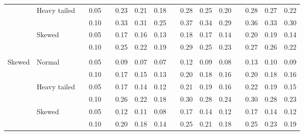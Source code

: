 \documentclass{article} %
\begin{document}
\begin{table}[ht]
\begin{scriptsize}
\begin{center}
\begin{tabular}{ll p{.1cm} c p{.1cm} rrr p{.1cm} rrr p{.1cm} rrr}
             & Heavy tailed && 0.05 &&   0.23 & 0.21 & 0.18 && 0.28 & 0.25 & 0.20 &&  0.28 & 0.27 & 0.22 \\
             &              && 0.10 &&   0.33 & 0.31 & 0.25 && 0.37 & 0.34 & 0.29 &&  0.36 & 0.33 & 0.30 \\
             & Skewed       && 0.05 &&   0.17 & 0.16 & 0.13 && 0.18 & 0.17 & 0.14 &&  0.20 & 0.19 & 0.14 \\
             &              && 0.10 &&   0.25 & 0.22 & 0.19 && 0.29 & 0.25 & 0.23 &&  0.27 & 0.26 & 0.22 \\
             &&&&&&&&&&&&&&&\\
Skewed       & Normal       && 0.05 &&   0.09 & 0.07 & 0.07 && 0.12 & 0.09 & 0.08 &&  0.13 & 0.10 & 0.09 \\ 
             &              && 0.10 &&   0.17 & 0.15 & 0.13 && 0.20 & 0.18 & 0.16 &&  0.20 & 0.18 & 0.16 \\ 
             & Heavy tailed && 0.05 &&   0.17 & 0.14 & 0.12 && 0.21 & 0.19 & 0.16 &&  0.22 & 0.19 & 0.15 \\ 
             &              && 0.10 &&   0.26 & 0.22 & 0.18 && 0.30 & 0.28 & 0.24 &&  0.30 & 0.28 & 0.23 \\ 
             & Skewed       && 0.05 &&   0.12 & 0.11 & 0.08 && 0.17 & 0.14 & 0.12 &&  0.17 & 0.14 & 0.12 \\ 
             &              && 0.10 &&   0.20 & 0.18 & 0.14 && 0.25 & 0.21 & 0.18 &&  0.25 & 0.23 & 0.19 \\ 



\end{tabular}
\end{center}
\end{scriptsize}
\end{table}
\end{document}
